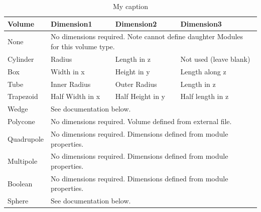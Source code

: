 \begin{table}[]
\centering
\caption{My caption}
\label{my-label}
\begin{tabular}{|l|l|l|l|}
\hline
\textbf{Volume} & \textbf{Dimension1}             & \textbf{Dimension2}             & \textbf{Dimension3}                \\ \hline
None            & \multicolumn{3}{l|}{No dimensions required. Note cannot define daughter Modules for this volume type.} \\ \hline
Cylinder        & Radius                          & Length in z                     & Not used (leave blank)             \\ \hline
Box             & Width in x                      & Height in y                     & Length along z                     \\ \hline
Tube            & Inner Radius                    & Outer Radius                    & Length in z                        \\ \hline
Trapezoid       & Half Width in x                 & Half Height in y                & Half length in z                   \\ \hline
Wedge           & \multicolumn{3}{l|}{See documentation below.}                                                          \\ \hline
Polycone        & \multicolumn{3}{l|}{No dimensions required. Volume defined from external file.}                        \\ \hline
Quadrupole      & \multicolumn{3}{l|}{No dimensions required. Dimensions defined from module properties.}                \\ \hline
Multipole       & \multicolumn{3}{l|}{No dimensions required. Dimensions defined from module properties.}                \\ \hline
Boolean         & \multicolumn{3}{l|}{No dimensions required. Dimensions defined from module properties.}                \\ \hline
Sphere          & \multicolumn{3}{l|}{See documentation below.}                                                          \\ \hline
\end{tabular}
\end{table}

